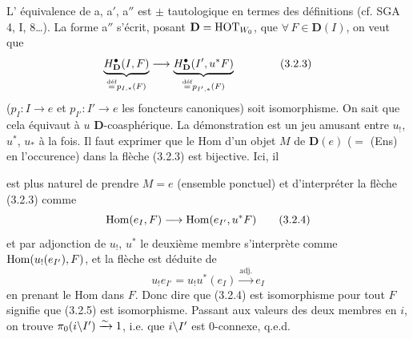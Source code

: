 L' équivalence de a, a$'$, a$''$ est $\pm$ tautologique en termes des définitions (cf. SGA 4, I, 8\dots). La forme a$''$ s'écrit, posant $\mathbf{D} = \mathrm{HOT}_{W_0}$, que $\forall\, F \in \mathbf{D}(I)$, on veut que
\[
\underbrace{H^{\bullet}_{\mathbf{D}}(I,F)}_{\defeq p_{I,*}(F)} \longrightarrow \underbrace{H^{\bullet}_{\mathbf{D}}(I',u^*F)}_{\defeq p_{I',*}(F)} \qquad \tag*{(3.2.3)}
\]
($p_I : I \longrightarrow e$ et $p_{I'} : I' \longrightarrow e$ les foncteurs canoniques) soit isomorphisme. On sait que cela équivaut à $u$ $\mathbf{D}$-coasphérique. La démonstration est un jeu amusant entre $u_!$, $u^*$, $u_*$ à la fois. Il faut exprimer que le Hom d'un objet $M$ de $\mathbf{D}(e)$ ($=$ (Ens) en l'occurence) dans la flèche (3.2.3) est bijective. Ici, il %


est plus naturel de prendre $M = e$ (ensemble ponctuel) et d'interpréter la flèche (3.2.3) comme
\[
\Hom(e_I, F) \longrightarrow \Hom(e_{I'}, u^*F)
\tag*{(3.2.4)}
\]
et par adjonction de $u_!$, $u^*$ le deuxième membre s'interprète comme $\operatorname{Hom}(u_!(e_{I'}), F)$, et la flèche est déduite de
\[
u_!e_{I'} = u_!u^*(e_I) \xrightarrow{\text{adj.}} e_I
\tag*{(3.2.5)}
\]
en prenant le Hom dans $F$. Donc dire que (3.2.4) est isomorphisme pour tout $F$ signifie que (3.2.5) est isomorphisme. Passant aux valeurs des deux membres en $i$, on trouve $\pi_0(i\backslash I') \xrightarrow{\sim} 1$, i.e. que $i\backslash I'$ est 0-connexe, q.e.d.

